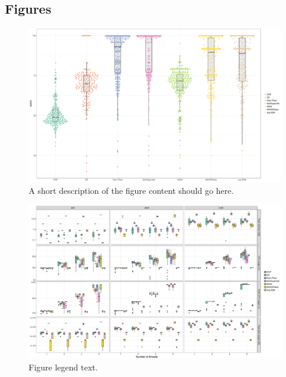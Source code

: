 \documentclass{bmcart}
\begin{document}
\begin{backmatter}



\section*{Figures}
  \begin{figure}[h!]
  \includegraphics[width=\textwidth]{plots/swarm.pdf}
  \caption{
      A short description of the figure content
      should go here.}
      \end{figure}

\begin{figure}[h!]
  \includegraphics[width=\textwidth]{plots/usage_amount_threads.pdf}
  \caption{
      Figure legend text.}
      \end{figure}


\end{backmatter}
\end{document}
